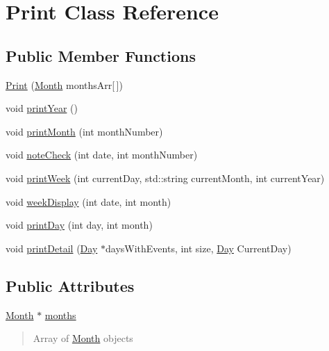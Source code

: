 \hypertarget{class_print}{}\section{Print Class Reference}
\label{class_print}
\subsection*{Public Member Functions}
\begin{DoxyCompactItemize}
\item 
\hyperlink{class_print_a7b9e4716438a4d6003fb53d740172463}{Print} (\hyperlink{class_month}{Month} months\+Arr\mbox{[}$\,$\mbox{]})
\item 
void \hyperlink{class_print_ab38ff940d0abba39ec72485ba3e16259}{print\+Year} ()
\item 
void \hyperlink{class_print_a783042d8e22a1b8a0b81bbcbc9bb03f0}{print\+Month} (int month\+Number)
\item 
void \hyperlink{class_print_ae528ed0fc9fe31222a1fcd33fe58d45b}{note\+Check} (int date, int month\+Number)
\item 
void \hyperlink{class_print_a5480160313e90ae75d51255bd20a54fe}{print\+Week} (int current\+Day, std\+::string current\+Month, int current\+Year)
\item 
void \hyperlink{class_print_a7013b300e4a36e6cd2fa8c68eab71892}{week\+Display} (int date, int month)
\item 
void \hyperlink{class_print_adcc0b985904ceb75634e3bb0b156d033}{print\+Day} (int day, int month)
\item 
void \hyperlink{class_print_a41b9f876be13879f8d0b76607ee09297}{print\+Detail} (\hyperlink{class_day}{Day} $\ast$days\+With\+Events, int size, \hyperlink{class_day}{Day} Current\+Day)
\end{DoxyCompactItemize}
\subsection*{Public Attributes}
\begin{DoxyCompactItemize}
\item 
\hypertarget{class_print_a9c8bb58b547f6ffd71b735b6bb0072b1}{}\label{class_print_a9c8bb58b547f6ffd71b735b6bb0072b1} 
\hyperlink{class_month}{Month} $\ast$ \hyperlink{class_print_a9c8bb58b547f6ffd71b735b6bb0072b1}{months}
\begin{DoxyCompactList}\small\item\em \begin{quote}
Array of \hyperlink{class_month}{Month} objects \end{quote}
\end{DoxyCompactList}\end{DoxyCompactItemize}


